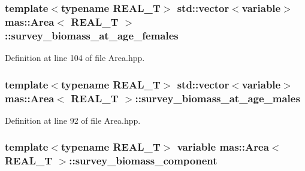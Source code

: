 \hypertarget{structmas_1_1_area_a903b4c889f85bdbd4804f15a6278c7b0}{
\subsubsection[{survey\-\_\-biomass\-\_\-at\-\_\-age\-\_\-females}]{\setlength{\rightskip}{0pt plus 5cm}template$<$typename R\-E\-A\-L\-\_\-\-T$>$ std\-::vector$<${\bf variable}$>$ {\bf mas\-::\-Area}$<$ R\-E\-A\-L\-\_\-\-T $>$\-::survey\-\_\-biomass\-\_\-at\-\_\-age\-\_\-females}}\label{structmas_1_1_area_a903b4c889f85bdbd4804f15a6278c7b0}


Definition at line 104 of file Area.\-hpp.

\hypertarget{structmas_1_1_area_a5ece3cad1dd8083d91747c5aa81b1193}{
\subsubsection[{survey\-\_\-biomass\-\_\-at\-\_\-age\-\_\-males}]{\setlength{\rightskip}{0pt plus 5cm}template$<$typename R\-E\-A\-L\-\_\-\-T$>$ std\-::vector$<${\bf variable}$>$ {\bf mas\-::\-Area}$<$ R\-E\-A\-L\-\_\-\-T $>$\-::survey\-\_\-biomass\-\_\-at\-\_\-age\-\_\-males}}\label{structmas_1_1_area_a5ece3cad1dd8083d91747c5aa81b1193}


Definition at line 92 of file Area.\-hpp.

\hypertarget{structmas_1_1_area_a8b7482442ba3e2008120c09b14343f56}{
\subsubsection[{survey\-\_\-biomass\-\_\-component}]{\setlength{\rightskip}{0pt plus 5cm}template$<$typename R\-E\-A\-L\-\_\-\-T$>$ {\bf variable} {\bf mas\-::\-Area}$<$ R\-E\-A\-L\-\_\-\-T $>$\-::survey\-\_\-biomass\-\_\-component}}\label{structmas_1_1_area_a8b7482442ba3e2008120c09b14343f56}


